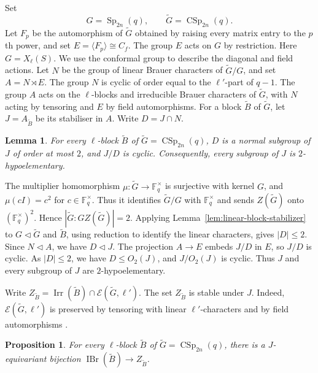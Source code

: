 \documentclass[10pt]{amsart}
\newtheorem{proposition}[theorem]{Proposition}
\newtheorem{lemma}[theorem]{Lemma}
\theoremstyle{definition}
\renewcommand{\leq}{\leqslant}
\let\oldendproof\endproof
\renewenvironment{proof}[1][\proofname]{%
  \oldproof[\bfseries #1]%
}{\oldendproof}
\DeclareMathOperator{\IBr}{IBr}
\DeclareMathOperator{\Irr}{Irr}
\DeclareMathOperator{\Sp}{Sp}
\DeclareMathOperator{\CSp}{CSp}
\newcommand{\F}{\mathbb F}
\numberwithin{equation}{section}
\numberwithin{table}{section}
\begin{document}
Set
\[
   G=\Sp_{2n}(q),\qquad \widetilde G=\CSp_{2n}(q).
\]
Let $F_p$ be the automorphism of $\widetilde G$ obtained by raising every
matrix entry to the $p$th power, and set $E=\langle F_p\rangle\cong C_f$.
The group $E$ acts on $G$ by restriction.  Here $G=X_\ell(S)$.  We use the conformal group to describe the diagonal
and field actions.  Let $N$ be the group of linear Brauer
characters of $\widetilde G/G$, and set $A=N\rtimes E$.
The group $N$ is cyclic of order equal to the $\ell'$-part of $q-1$.
The group $A$ acts on the $\ell$-blocks and irreducible Brauer
characters of $\widetilde G$, with $N$ acting by tensoring and
$E$ by field automorphisms.  For a block
$\widetilde B$ of $\widetilde G$, let $J=A_{\widetilde B}$ be its
stabiliser in $A$. Write $D=J\cap N$.

\begin{lemma}\label{lem:exact-stabilizer}
For every $\ell$-block $\widetilde B$ of $\widetilde G=\CSp_{2n}(q)$,
$D$ is a normal subgroup of $J$ of order at most $2$, and $J/D$ is cyclic.
Consequently, every subgroup of $J$ is $2$-hypoelementary.
\end{lemma}

\begin{proof}
The multiplier homomorphism $\mu:\widetilde G\to\F_q^\times$ is
surjective with kernel $G$, and $\mu(cI)=c^2$ for $c\in\F_q^\times$.
Thus it identifies $\widetilde G/G$ with $\F_q^\times$ and sends
$Z(\widetilde G)$ onto $(\F_q^\times)^2$.
Hence $|\widetilde G:GZ(\widetilde G)|=2$.
Applying Lemma~\ref{lem:linear-block-stabilizer} to
$G\lhd\widetilde G$ and $\widetilde B$, using reduction to identify
the linear characters, gives $|D|\leq2$.
Since $N\triangleleft A$, we have $D\triangleleft J$.
The projection $A\to E$ embeds $J/D$ in $E$, so $J/D$ is cyclic.
As $|D|\leq2$, we have $D\leq O_2(J)$, and $J/O_2(J)$ is cyclic.
Thus $J$ and every subgroup of $J$ are $2$-hypoelementary.
\end{proof}

Write $Z_{\widetilde B}=\Irr(\widetilde B)\cap
\mathcal E(\widetilde G,\ell')$.
The set $Z_{\widetilde B}$ is stable under $J$.  Indeed,
$\mathcal E(\widetilde G,\ell')$ is preserved by tensoring with linear
$\ell'$-characters \cite[Remark~2.5]{Li2021} and by field automorphisms
\cite[Theorem~3.1]{CabanesSpath2013}.

\begin{proposition}
\label{prop:odd-conformal-bridge}
For every $\ell$-block $\widetilde B$ of $\widetilde G=\CSp_{2n}(q)$,
there is a $J$-equivariant bijection
$\IBr(\widetilde B)\longrightarrow Z_{\widetilde B}$.
\end{proposition}
\end{document}
